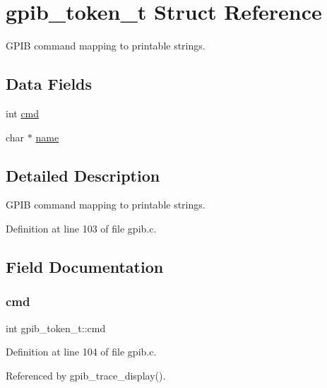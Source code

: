 \hypertarget{structgpib__token__t}{}\section{gpib\+\_\+token\+\_\+t Struct Reference}
\label{structgpib__token__t}


G\+P\+IB command mapping to printable strings.  


\subsection*{Data Fields}
\begin{DoxyCompactItemize}
\item 
int \hyperlink{structgpib__token__t_a8bc698b3cba149e3abbf935e623775c0}{cmd}
\item 
char $\ast$ \hyperlink{structgpib__token__t_aa47fb36b52bd83dc60e67a54f6e36e09}{name}
\end{DoxyCompactItemize}


\subsection{Detailed Description}
G\+P\+IB command mapping to printable strings. 

Definition at line 103 of file gpib.\+c.



\subsection{Field Documentation}
\mbox{\label{structgpib__token__t_a8bc698b3cba149e3abbf935e623775c0}} 
\subsubsection{\texorpdfstring{cmd}{cmd}}
{\footnotesize\ttfamily int gpib\+\_\+token\+\_\+t\+::cmd}



Definition at line 104 of file gpib.\+c.



Referenced by gpib\+\_\+trace\+\_\+display().

\mbox{\label{structgpib__token__t_aa47fb36b52bd83dc60e67a54f6e36e09}} 
